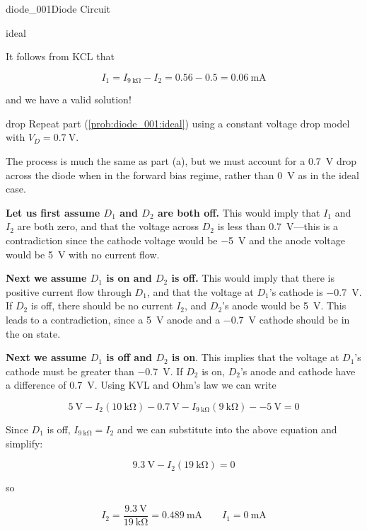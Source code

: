 \begin{mainquestion}{diode_001}{Diode Circuit}
\begin{partquestion}{ideal}
\begin{answer}
It follows from KCL that

\[
I_1
=
I_{\qty{9}{\kilo\ohm}}-I_2
=
0.56 - 0.5
=
\qty{0.06}{\milli\ampere}
\]

and we have a valid solution!
\end{answer}
\end{partquestion}

\begin{partquestion}{drop}
{Repeat part (\cref{prob:diode_001:ideal}) using a constant voltage drop model with $V_D = \qty{0.7}{\volt}$.}

\begin{answer}
The process is much the same as part (a), but we must account for a \qty{0.7}{\volt} drop across the diode when in the forward bias regime, rather than \qty{0}{\volt} as in the ideal case.

\textbf{Let us first assume $D_1$ and $D_2$ are both off.} This would imply that $I_1$ and $I_2$ are both zero, and that the voltage across $D_2$ is less than \qty{0.7}{\volt}—this is a contradiction since the cathode voltage would be \qty{-5}{\volt} and the anode voltage would be \qty{5}{\volt} with no current flow.

\textbf{Next we assume $D_1$ is on and $D_2$ is off.} This would imply that there is positive current flow through $D_1$, and that the voltage at $D_1$'s cathode is \qty{-0.7}{\volt}. If $D_2$ is off, there should be no current $I_2$, and $D_2$'s anode would be \qty{5}{\volt}. This leads to a contradiction, since a \qty{5}{\volt} anode and a \qty{-0.7}{\volt} cathode should be in the on state.

\textbf{Next we assume $D_1$ is off and $D_2$ is on}. This implies that the voltage at $D_1$'s cathode must be greater than \qty{-0.7}{\volt}. If $D_2$ is on, $D_2$'s anode and cathode have a difference of \qty{0.7}{\volt}. Using KVL and Ohm's law we can write

\[
\qty{5}{\volt}
-
I_2\left(\qty{10}{\kilo\ohm}\right)
-
\qty{0.7}{\volt}
-
I_{\qty{9}{\kilo\ohm}}\left(\qty{9}{\kilo\ohm}\right)
-
\qty{-5}{\volt}
=
0
\]

Since $D_1$ is off, $I_{\qty{9}{\kilo\ohm}} = I_2$ and we can substitute into the above equation and simplify:

\[
\qty{9.3}{\volt}
-
I_2\left(\qty{19}{\kilo\ohm}\right)
=
0
\]

so

\[
I_2
=
\frac{\qty{9.3}{\volt}}{\qty{19}{\kilo\ohm}}
=
\qty{0.489}{\milli\ampere}
\qquad
I_1 = \qty{0}{\milli\ampere}
\]


\end{answer}
\end{partquestion}
\end{mainquestion}
